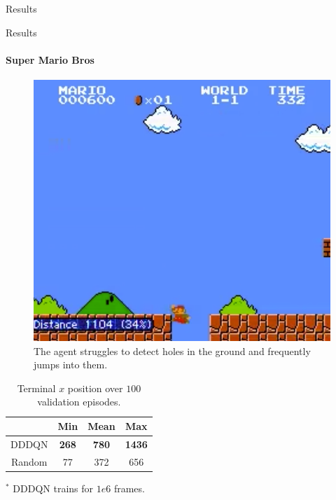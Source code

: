 \documentclass{beamer}
\begin{document}
\begin{frame}{Results}
\end{frame}



\begin{frame}{Results}
\framesubtitle{Super Mario Bros}
\begin{minipage}{\textwidth}
%
\begin{minipage}{0.4\textwidth}
\begin{figure}
\includegraphics[width=\textwidth]{img/smb_clip}
\caption*{The agent struggles to detect holes in the ground and frequently
jumps into them.}
\end{figure}
\end{minipage}
%
\hfill
%
\begin{minipage}{0.5\textwidth}
    \begin{table}
    \centering
    \caption{Terminal $x$ position over $100$ validation episodes.}
    \begin{threeparttable}
    \begin{tabular}{||c c c c||}
    \hline
    & Min & Mean & Max \\ [0.5ex]
    \hline\hline
    DDDQN & \textbf{268} & \textbf{780} & \textbf{1436} \\
    \hline
    Random & 77 & 372 & 656 \\
    \hline
    \end{tabular}
    \begin{tablenotes}
        \small
        \item $^*$ DDDQN trains for $1e6$ frames.
    \end{tablenotes}
    \end{threeparttable}
    \end{table}
\end{minipage}
%
\end{minipage}
\end{frame}
\end{document}
